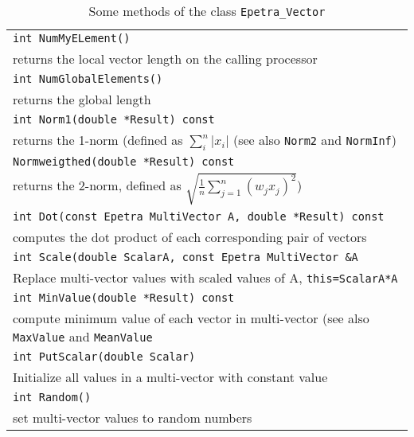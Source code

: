 \begin{table}
\begin{center}
\begin{tabular}{ | p{15cm} | }
\hline
\verb!int NumMyELement()! \\
\hspace{1cm} returns the local vector length on the
calling processor \\
\verb!int NumGlobalElements()! \\
\hspace{1cm} returns the  global length\\
\verb!int Norm1(double *Result) const! \\
\hspace{1cm} returns the 1-norm (defined as $\sum_i^n |
  x_i|$ (see also \verb!Norm2! and \verb!NormInf!)\\
\verb!Normweigthed(double *Result) const! \\
\hspace{1cm} returns the  2-norm, defined as
$\sqrt{ \frac{1}{n} \sum_{j=1}^{n} (w_j x_j)^2}$) \\
\verb!int Dot(const Epetra MultiVector A, double *Result) const! \\
\hspace{1cm} computes
the dot product of each corresponding pair of vectors \\
\verb!int Scale(double ScalarA, const Epetra MultiVector &A! \\
\hspace{1cm} 
Replace multi-vector values with scaled values of A,
\verb!this=ScalarA*A! \\
\verb!int MinValue(double *Result) const! \\
\hspace{1cm} compute minimum value of
each vector in multi-vector (see also \verb!MaxValue! and \verb!MeanValue!\\
\verb!int PutScalar(double Scalar)! \\
\hspace{1cm} Initialize all values in a
multi-vector with constant value \\
\verb!int Random()! \\
\hspace{1cm}  set multi-vector values to random numbers \\

\hline
\end{tabular}
\caption{Some methods of the class {\tt Epetra\_Vector}}
\label{tab:distr_vec}
\end{center}
\end{table}

